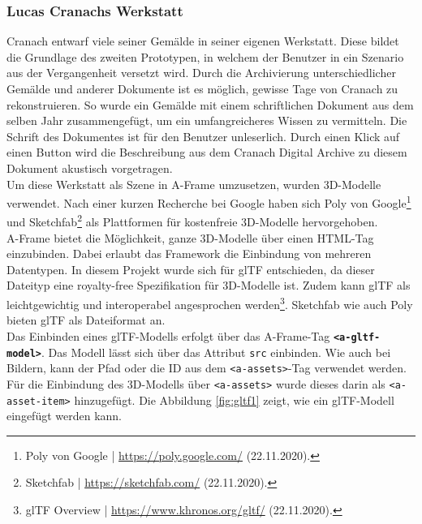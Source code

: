 \documentclass[a4paper,12pt,oneside]{article}
\begin{document}
      \subsubsection{Lucas Cranachs Werkstatt}
        Cranach entwarf viele seiner Gemälde in seiner
        eigenen Werkstatt. Diese bildet die Grundlage 
        des zweiten Prototypen, in welchem der Benutzer in 
        ein Szenario aus der Vergangenheit
        versetzt wird. 
        Durch die Archivierung unterschiedlicher Gemälde 
        und anderer Dokumente ist es möglich, gewisse Tage
        von Cranach zu rekonstruieren. So wurde ein
        Gemälde mit einem schriftlichen Dokument aus
        dem selben Jahr zusammengefügt, um ein umfangreicheres
        Wissen zu vermitteln. Die Schrift des Dokumentes
        ist für den Benutzer unleserlich. Durch einen Klick
        auf einen Button wird die Beschreibung aus dem Cranach
        Digital Archive zu diesem Dokument akustisch vorgetragen. \\
        Um diese Werkstatt als Szene in A-Frame umzusetzen, wurden 3D-Modelle
        verwendet. Nach einer kurzen Recherche bei Google haben sich
        Poly von Google\footnote{Poly von Google | \url{https://poly.google.com/} (22.11.2020).}
        und Sketchfab\footnote{Sketchfab | \url{https://sketchfab.com/} (22.11.2020).}
        als Plattformen für kostenfreie 3D-Modelle hervorgehoben. \\
        A-Frame bietet die Möglichkeit, ganze 3D-Modelle über einen
        HTML-Tag einzubinden. Dabei erlaubt das Framework die Einbindung von
        mehreren Datentypen. In diesem Projekt
        wurde sich für glTF entschieden, da dieser Dateityp eine 
        royalty-free Spezifikation für 3D-Modelle ist. Zudem kann glTF als leichtgewichtig 
        und interoperabel angesprochen werden\footnote{glTF Overview | \url{https://www.khronos.org/gltf/} (22.11.2020).}.
        Sketchfab wie auch Poly bieten glTF als Dateiformat an. \\
        Das Einbinden eines glTF-Modells erfolgt über das A-Frame-Tag 
        \texttt{\textbf{<a-gltf-model>}}. Das Modell lässt sich über das Attribut
        \texttt{src} einbinden. Wie auch bei Bildern, kann der Pfad oder die ID
        aus dem \texttt{<a-assets>}-Tag verwendet werden. 
        Für die Einbindung des 3D-Modells über \texttt{<a-assets>} wurde dieses
        darin als \texttt{<a-asset-item>} hinzugefügt.
        Die Abbildung \ref{fig:gltf1} zeigt, wie ein glTF-Modell 
        eingefügt werden kann.
\end{document}
